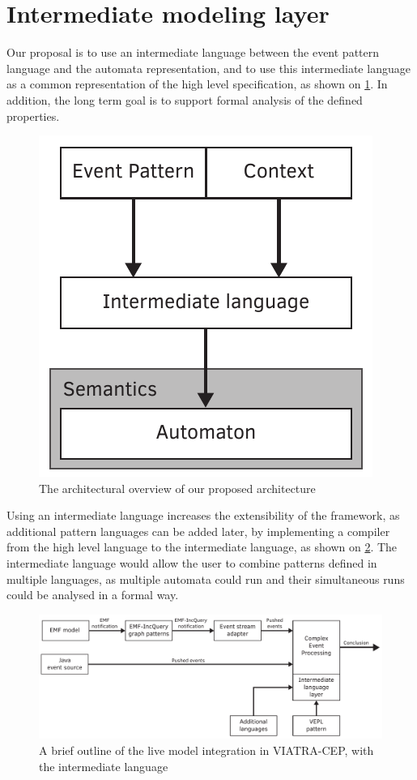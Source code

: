 \section{Intermediate modeling layer}
Our proposal is to use an intermediate language between the event pattern language and the automata representation, and to use this intermediate language as a common representation of the high level specification, as shown on \cref{fig:viatracep:newcep}. In addition, the long term goal is to support formal analysis of the defined properties. 


\begin{figure}[h]
	\centering
	\includegraphics[width=0.4\linewidth]{figures/chapter_3/newcep}
	\caption{The architectural overview of our proposed architecture \redraw}
	\label{fig:viatracep:newcep}
\end{figure}


Using an intermediate language increases the extensibility of the framework, as additional pattern languages can be added later, by implementing a compiler from the high level language to the intermediate language, as shown on \cref{fig:viatracep:newinputs}.
The intermediate language would allow the user to combine patterns defined in multiple languages, as multiple automata could run and their simultaneous runs could be analysed in a formal way.


\begin{figure}[h]
	\centering
	\includegraphics[width=0.9\linewidth]{figures/chapter_3/newinput}
	\caption{A brief outline of the live model integration in VIATRA-CEP, with the intermediate language \redraw}
	\label{fig:viatracep:newinputs}
\end{figure}